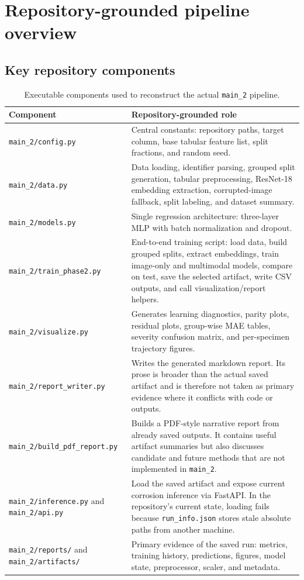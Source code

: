 \documentclass[11pt]{article}
\begin{document}
\section{Repository-grounded pipeline overview}

\subsection{Key repository components}

\begin{table}[H]
\centering
\small
\begin{tabularx}{\textwidth}{p{} p{}}
\toprule
\textbf{Component} & \textbf{Repository-grounded role} \\
\midrule
\texttt{main\_2/config.py} & Central constants: repository paths, target column, base tabular feature list, split fractions, and random seed. \\
\texttt{main\_2/data.py} & Data loading, identifier parsing, grouped split generation, tabular preprocessing, ResNet-18 embedding extraction, corrupted-image fallback, split labeling, and dataset summary. \\
\texttt{main\_2/models.py} & Single regression architecture: three-layer MLP with batch normalization and dropout. \\
\texttt{main\_2/train\_phase2.py} & End-to-end training script: load data, build grouped splits, extract embeddings, train image-only and multimodal models, compare on test, save the selected artifact, write CSV outputs, and call visualization/report helpers. \\
\texttt{main\_2/visualize.py} & Generates learning diagnostics, parity plots, residual plots, group-wise MAE tables, severity confusion matrix, and per-specimen trajectory figures. \\
\texttt{main\_2/report\_writer.py} & Writes the generated markdown report. Its prose is broader than the actual saved artifact and is therefore not taken as primary evidence where it conflicts with code or outputs. \\
\texttt{main\_2/build\_pdf\_report.py} & Builds a PDF-style narrative report from already saved outputs. It contains useful artifact summaries but also discusses candidate and future methods that are not implemented in \texttt{main\_2}. \\
\texttt{main\_2/inference.py} and \texttt{main\_2/api.py} & Load the saved artifact and expose current corrosion inference via FastAPI. In the repository's current state, loading fails because \texttt{run\_info.json} stores stale absolute paths from another machine. \\
\texttt{main\_2/reports/} and \texttt{main\_2/artifacts/} & Primary evidence of the saved run: metrics, training history, predictions, figures, model state, preprocessor, scaler, and metadata. \\
\bottomrule
\end{tabularx}
\caption{Executable components used to reconstruct the actual \texttt{main\_2} pipeline.}
\label{tab:repo_components}
\end{table}
\end{document}
